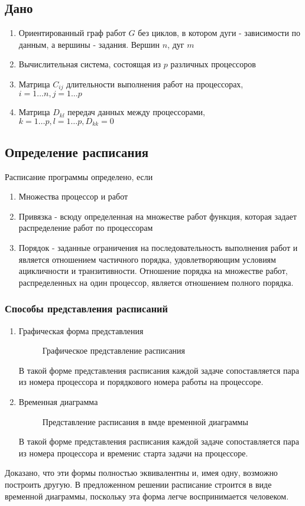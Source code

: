 \subsection*{Дано}
\begin{enumerate}
    \item Ориентированный граф работ $G$ без циклов, в котором дуги - зависимости по данным, а вершины - задания. Вершин $n$, дуг $m$
    \item Вычислительная система, состоящая из $p$ различных процессоров
    \item Матрица $C_{ij}$ длительности выполнения работ на процессорах, $i=1 \dots n, j=1 \dots p$
    \item Матрица $D_{kl}$ передач данных между процессорами, $k=1 \dots p, l = 1 \dots p, D_{kk} = 0$
\end{enumerate}
\subsection*{Определение расписания}
Расписание программы определено, если
\begin{enumerate}
    \item Множества процессор и работ
    \item Привязка - всюду определенная на множестве работ функция, которая задает распределение работ по процессорам
    \item Порядок - заданные ограничения на последовательность выполнения работ и является отношением частичного порядка, удовлетворяющим условиям ацикличности и транзитивности. Отношение порядка на множестве работ, распределенных на один процессор, является отношением полного порядка.
\end{enumerate}
\subsubsection*{Способы представления расписаний}
\begin{enumerate}
    \item Графическая форма представления
    \begin{figure}[H]
        \caption{Графическое представление расписания}
    \end{figure}
    В такой форме представления расписания каждой задаче сопоставляется пара из номера процессора и порядкового номера работы на процессоре. 
    \item Временная диаграмма
    \begin{figure}[H]
        \caption{Представление расписания в вмде временной диаграммы}
    \end{figure}
    В такой форме представления расписания каждой задаче сопоставляется пара из номера процессора и временис старта задачи на процессоре.
\end{enumerate}
Доказано, что эти формы полностью эквивалентны и, имея одну, возможно построить другую. В предложенном решении расписание строится в виде временной диаграммы, поскольку эта форма легче воспринимается человеком.

